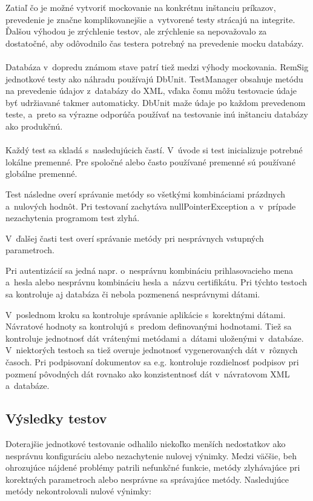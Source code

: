 \documentclass[
  digital, %
  table,   %
oneside,
  nolof,     %
  nolot,     %
]{fithesis3}
\begin{document}
Zatiaľ čo je možné vytvoriť mockovanie na konkrétnu inštanciu príkazov, prevedenie je značne komplikovanejšie a~vytvorené testy strácajú na integrite. Ďalšou výhodou je zrýchlenie testov, ale zrýchlenie sa nepovažovalo za dostatočné, aby odôvodnilo čas testera potrebný na prevedenie mocku databázy. \paragraph{}
Databáza v~dopredu známom stave patrí tiež medzi výhody mockovania. RemSig jednotkové testy ako náhradu  používajú DbUnit. TestManager obsahuje metódu na   prevedenie údajov z~databázy do XML, vďaka čomu môžu testovacie údaje byť udržiavané takmer automaticky. DbUnit maže údaje po každom prevedenom teste, a~preto sa výrazne odporúča používať na testovanie inú inštanciu databázy ako produkčnú. \paragraph{}

Každý test sa skladá s~nasledujúcich častí. V~úvode si test inicializuje potrebné lokálne premenné. Pre spoločné alebo často používané premenné sú používané globálne premenné. 

Test následne overí správanie metódy so všetkými kombináciami prázdnych a~nulových hodnôt. Pri testovaní zachytáva nullPointerException a~v~prípade nezachytenia programom test zlyhá.

V~ďalšej časti test overí správanie metódy pri nesprávnych vstupných parametroch.

 Pri autentizácií sa jedná napr. o~nesprávnu kombináciu prihlasovacieho mena a~hesla alebo nesprávnu kombináciu hesla a~názvu certifikátu. Pri týchto testoch sa kontroluje aj databáza či nebola pozmenená nesprávnymi dátami.
 
  V~poslednom kroku sa kontroluje správanie aplikácie s~korektnými dátami. Návratové hodnoty sa kontrolujú s~predom definovanými hodnotami.
  Tiež sa kontroluje jednotnosť dát vrátenými metódami a~dátami uloženými v~databáze. V~niektorých testoch sa tiež overuje jednotnosť vygenerovaných dát v~rôznych časoch. Pri podpisovaní dokumentov sa e.g. kontroluje rozdielnosť podpisov pri pozmení pôvodných dát rovnako ako konzistentnosť dát v~návratovom XML a~databáze.   

\subsection{Výsledky testov}
Doterajšie jednotkové testovanie odhalilo niekoľko menších nedostatkov ako nesprávnu konfiguráciu alebo nezachytenie nulovej výnimky. Medzi väčšie, beh ohrozujúce nájdené problémy patrili nefunkčné funkcie, metódy zlyhávajúce pri korektných parametroch alebo nesprávne sa správajúce metódy.  
Nasledujúce metódy nekontrolovali nulové výnimky: 
\end{document}
